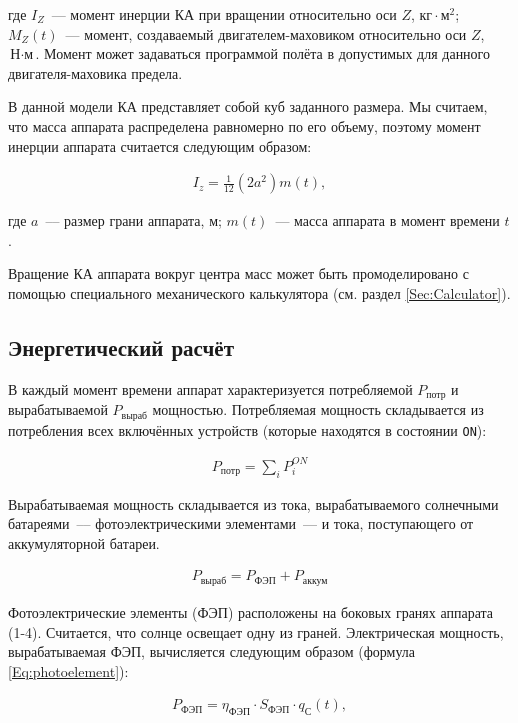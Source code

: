 \documentclass[12pt,a4paper]{article}
\begin{document}
где $I_Z$~--- момент инерции КА при вращении относительно оси $Z$, $\text{кг} \cdot \text{м}^2$;
$M_Z(t)$~--- момент, создаваемый двигателем-маховиком относительно оси $Z$, $\text{Н}
\cdot \text{м}$. Момент может задаваться программой полёта в допустимых для данного
двигателя-маховика предела.

В данной модели КА представляет собой куб заданного размера. Мы считаем, что масса
аппарата распределена равномерно по его объему, поэтому момент инерции аппарата считается
следующим образом:

\begin{eqnarray}
  I_z = \frac{1}{12} (2 a^2) m(t), \label{Eq:inertia-moment}
\end{eqnarray}

где $a$~--– размер грани аппарата, м; $m(t)$~--- масса аппарата в момент времени $t$.

Вращение КА аппарата вокруг центра масс может быть промоделировано с помощью специального
механического калькулятора (см. раздел \ref{Sec:Calculator}).

\subsection{Энергетический расчёт}
\label{Sec:Energy}

В каждый момент времени аппарат характеризуется потребляемой $P_{\text{потр}}$ и
вырабатываемой $P_{\text{выраб}}$ мощностью. Потребляемая мощность складывается из
потребления всех включённых устройств (которые находятся в состоянии \verb'ON'):

\begin{eqnarray}
  P_{\text{потр}} = \sum_i{P_{i}^{ON}}
\end{eqnarray}

Вырабатываемая мощность складывается из тока, вырабатываемого солнечными батареями~--–
фотоэлектрическими элементами~--- и тока, поступающего от аккумуляторной батареи.

\begin{eqnarray}
  P_{\text{выраб}} = P_{\text{ФЭП}} + P_{\text{аккум}}
\end{eqnarray}

Фотоэлектрические элементы (ФЭП) расположены на боковых гранях аппарата (1-4). Считается,
что солнце освещает одну из граней. Электрическая мощность, вырабатываемая ФЭП,
вычисляется следующим образом (формула \ref{Eq:photoelement}):

\begin{eqnarray}
  P_{\text{ФЭП}} = \eta_{\text{ФЭП}} \cdot S_{\text{ФЭП}} \cdot q_{\text{С}}(t), \label{Eq:photoelement}
\end{eqnarray}
\end{document}

